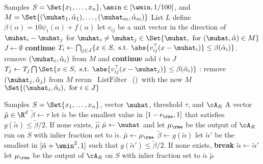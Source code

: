 \begin{algorithm}[t]
\caption{\(\operatorname{ListFilter}\)}
\label{alg:constructing_output}
    \begin{algorithmic}[1]
        \Require Samples \(S = \Set{x_1, \ldots, x_{n}}, \amin \in [\wmin, 1/100]\), and
    \(M = \Set{(\muhat_1, \hat\alpha_1), \ldots, (\muhat_m, \hat \alpha_m)}\)
    \Ensure List \(L\)
    \State define $\beta(\alpha) = 10 \psi_t(\alpha) + f(\alpha)$
    \State let \(v_{ij}\) be a unit vector in the direction of \(\muhat_i - \muhat_j\) for \(\muhat_i \neq \muhat_j \in \Set{\muhat, \text{ for }(\muhat, \hat \alpha) \in M}\)
    \State \(J \gets \emptyset\)
     {\textbf{continue}}
    \EndIf
    \State \(T_i \gets \bigcap_{j \in J}\{x \in S, \text{ s.t. } \abs{v_{ij}^{\top}(x - \muhat_i)} \leq \beta(\hat\alpha_i)\}\).
     remove  \((\muhat_i, \hat\alpha_i)\) from \(M\) and \textbf{continue}
    \EndIf
    \State add \(i\) to \(J\)
    \State  \(T_j \gets T_j \bigcap \Set{x \in S, \text{ s.t. } \abs{v_{ij}^{\top}(x - \muhat_j)} \leq \beta(\hat\alpha_i)}\)
    : 
    \State remove  \((\muhat_j, \hat\alpha_j)\) from \(M\) 
    \State rerun~\(\operatorname{ListFilter}\)~()~with the new \(M\)
    \EndIf
    \EndFor
    \EndFor
    \State \Return \(\Set{(\muhat_i, \hat \alpha_i), \text{ for } i \in J}\)
    \end{algorithmic}
\end{algorithm}

\begin{algorithm}[t]
\caption{\(\operatorname{ImproveWithRME}\)}
\label{alg:improve_rme}
    \begin{algorithmic}[1]
        \Require Samples \(S = \Set{x_1, \ldots, x_{n}}\), vector $\muhat$, threshold $\tau$, and $\cA_R$
        \Ensure A vector $\tilde\mu \in \R^d$
        \State \(\tilde\beta \gets \tau\)
        \State let $\tilde{\alpha}$ be the smallest value in $[1-\epsilon_{\rme}, 1]$ that satisfies $g(\tilde\alpha) \leq \tilde{\beta}/2$. If none exists, \Return $\hat\mu$
        \State $\tilde\mu \gets \muhat$ and let $\mu_{\rme}$ be the output of $\cA_R$ run on $S$ with inlier fraction set to $\tilde\alpha$.
        \State $\tilde\mu \gets \mu_{\rme}$
        \State $\tilde{\beta} \gets g(\tilde\alpha)$
        \State let $\tilde{\alpha}'$ be the smallest in $[\tilde\alpha + \wmin^2, 1]$ such that $g(\tilde\alpha') \leq \tilde{\beta}/2$. If none exists, \textbf{break}
        \State $\tilde\alpha \gets \tilde\alpha'$
        \State let $\mu_{\rme}$ be the output of $\cA_R$ on $S$ with inlier fraction set to $\tilde\alpha$
        \EndWhile
    \State \Return \(\tilde \mu\)
    \end{algorithmic}
\end{algorithm}

